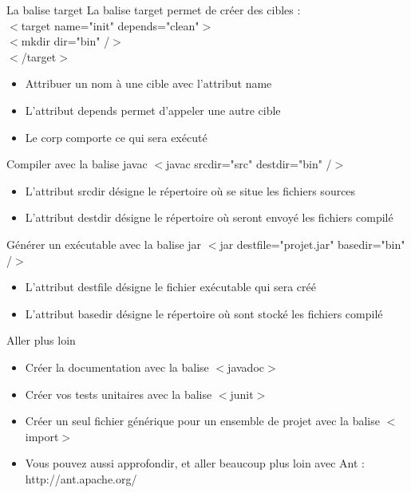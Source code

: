 \documentclass{beamer}
\begin{document}
\begin{frame}{La balise target}
    La balise target permet de cr\'eer des cibles :\\
    $<$target name="init" depends="clean"$>$\\
    $<$mkdir dir="bin" /$>$\\
    $<$/target$>$
    \newline
    \newline
    \begin{itemize}
        \item Attribuer un nom \`a une cible avec l'attribut name
        \item L'attribut depends permet d'appeler une autre cible
        \item Le corp comporte ce qui sera ex\'ecut\'e
    \end{itemize}
\end{frame}

\begin{frame}{Compiler avec la balise javac}
    $<$javac srcdir="src" destdir="bin" /$>$
    \newline
    \newline
    \begin{itemize}
        \item L'attribut srcdir d\'esigne le r\'epertoire o\`u se situe les fichiers sources
        \item L'attribut destdir d\'esigne le r\'epertoire o\`u seront envoy\'e les fichiers compil\'e
    \end{itemize}
\end{frame}

\begin{frame}{G\'en\'erer un ex\'ecutable avec la balise jar}
    $<$jar destfile="projet.jar" basedir="bin" /$>$
    \newline
    \newline
    \begin{itemize}
        \item L'attribut destfile d\'esigne le fichier ex\'ecutable qui sera cr\'e\'e
        \item L'attribut basedir d\'esigne le r\'epertoire o\`u sont stock\'e les fichiers compil\'e
    \end{itemize}
\end{frame}

\begin{frame}{Aller plus loin}
    \begin{itemize}
        \item Cr\'eer la documentation avec la balise $<$javadoc$>$
        \item Cr\'eer vos tests unitaires avec la balise $<$junit$>$
        \item Cr\'eer un seul fichier g\'en\'erique pour un ensemble de projet avec la balise $<$import$>$
        \item Vous pouvez aussi approfondir, et aller beaucoup plus loin avec Ant : http://ant.apache.org/
    \end{itemize}
\end{frame}
\end{document}
